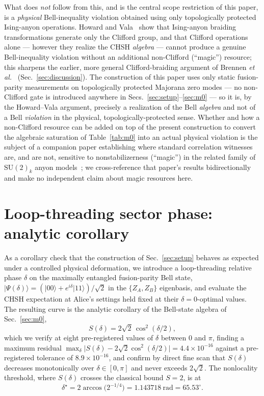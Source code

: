 \documentclass[aps,pra,twocolumn,superscriptaddress,floatfix,nofootinbib]{revtex4-2}
\providecommand{\ket}[1]{\lvert #1 \rangle}
\begin{document}
What does \emph{not} follow from this, and is the central scope
restriction of this paper, is a \emph{physical} Bell-inequality
violation obtained using only topologically protected Ising-anyon
operations. Howard and Vala~\cite{HowardVala2012} show that Ising-anyon
braiding transformations generate only the Clifford group, and that
Clifford operations alone --- however they realize the CHSH
\emph{algebra} --- cannot produce a genuine Bell-inequality violation
without an additional non-Clifford (``magic'') resource; this
sharpens the earlier, more general Clifford-braiding argument of
Brennen \emph{et al.}~\cite{Brennen2009} (Sec.~\ref{sec:discussion}).
The construction of this paper uses only static fusion-parity
measurements on topologically protected Majorana zero modes --- no
non-Clifford gate is introduced anywhere in Secs.~\ref{sec:setup}--\ref{sec:m0}
--- so it is, by the Howard--Vala argument, precisely a realization of
the Bell \emph{algebra} and not of a Bell \emph{violation} in the
physical, topologically-protected sense. Whether and how a
non-Clifford resource can be added on top of the present construction
to convert the algebraic saturation of Table~\ref{tab:m0} into an
actual physical violation is the subject of a companion paper
establishing where standard correlation witnesses are, and are not,
sensitive to nonstabilizerness (``magic'') in the related family of
$\mathrm{SU}(2)_k$ anyon models~\cite{Sayim2026magic}; we cross-reference
that paper's results bidirectionally and make no independent claim
about magic resources here.

\section{Loop-threading sector phase: analytic corollary}
\label{sec:m5}

As a corollary check that the construction of Sec.~\ref{sec:setup}
behaves as expected under a controlled physical deformation, we
introduce a loop-threading relative phase $\delta$ on the maximally
entangled fusion-parity Bell state,
$\ket{\Psi(\delta)}=(\ket{00}+e^{i\delta}\ket{11})/\sqrt2$ in the
$\{Z_A,Z_B\}$ eigenbasis, and evaluate the CHSH expectation at Alice's
settings held fixed at their $\delta=0$-optimal values. The resulting
curve is the analytic corollary of the Bell-state algebra of
Sec.~\ref{sec:m0},
\begin{equation}
\label{eq:Sdelta}
S(\delta) = 2\sqrt2\,\cos^2(\delta/2),
\end{equation}
which we verify at eight pre-registered values of $\delta$ between $0$
and $\pi$, finding a maximum residual
$\max_\delta\lvert S(\delta)-2\sqrt2\cos^2(\delta/2)\rvert=4.4\times10^{-16}$
against a pre-registered tolerance of $8.9\times10^{-16}$, and confirm
by direct fine scan that $S(\delta)$ decreases monotonically over
$\delta\in[0,\pi]$ and never exceeds $2\sqrt2$. The nonlocality
threshold, where $S(\delta)$ crosses the classical bound $S=2$, is at
\begin{equation}
\delta^\star = 2\arccos\bigl(2^{-1/4}\bigr) = 1.143718\ \mathrm{rad} = 65.53^\circ.
\end{equation}
\end{document}
